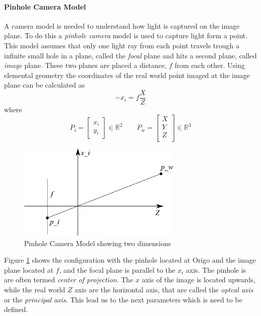 \paragraph{Pinhole Camera Model}
A camera model is needed to understand how light is captured on the image plane. To do
this a \emph{pinhole camera} model is used to capture light form a point. This model
assumes that only one light ray from each point travels trough a infinite small hole in
a plane, called the \emph{focal} plane and hits a second plane, called \emph{image} plane.
These two planes are placed a distance, $f$ from each other. Using elemental geometry the
coordinates of the real world point imaged at the image plane can be calculated as
\begin{equation}
    -x_i = f \frac{X}{Z}
\end{equation}
where
\begin{equation}
    P_i = \left [ \begin{array}{c}
        x_i \\
        y_i 
    \end{array} \right]  \in \mathbb{R}^2 \quad \quad P_w = \left [
    \begin{array}{c}
        X \\
        Y \\
        Z \\ 
    \end{array} \right] \in \mathbb{R}^3 
\end{equation}
\begin{figure}[hbtp]
    \centering
    \includegraphics[width=0.7\textwidth]{pics/pinhole_model}
    \caption{Pinhole Camera Model showing two dimensions}
    \label{chap2:fig-pinholemodel}
\end{figure}

Figure \ref{chap2:fig-pinholemodel} shows the configuration with the pinhole located at
Origo and the image plane located at $f$, and the focal plane is parallel to the $x_i$
axis. The pinhole is are often termed \emph{center of projection}. The $x$ axis of the image is located
upwards, while the real world $Z$ axis are the horizontal axis, that are called the
\emph{optcal axis} or the \emph{principal axis}. This lead us to the next parameters which
is need to be defined.

